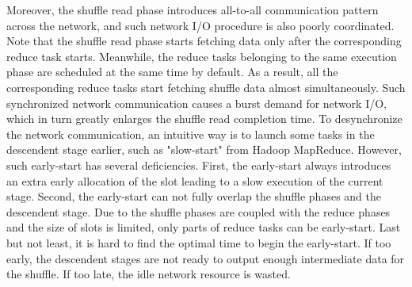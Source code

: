 Moreover, the shuffle read phase introduces all-to-all communication pattern across the network, and such network I/O procedure is also poorly coordinated.
Note that the shuffle read phase starts fetching data only after the corresponding reduce task starts.
Meanwhile, the reduce tasks belonging to the same execution phase are scheduled at the same time by default. 
As a result, all the corresponding reduce tasks start fetching shuffle data almost simultaneously.
Such synchronized network communication causes a burst demand for network I/O, which in turn greatly enlarges the shuffle read completion time. 
To desynchronize the network communication, an intuitive way is to launch some tasks in the descendent stage earlier, such as "slow-start" from Hadoop MapReduce.
{\color{black}
However, such early-start has several deficiencies.
First, the early-start always introduces an extra early allocation of the slot leading to a slow execution of the current stage.
Second, the early-start can not fully overlap the shuffle phases and the descendent stage. Due to the shuffle phases are coupled with the reduce phases and the size of slots is limited, only parts of reduce tasks can be early-start. 
Last but not least, it is hard to find the optimal time to begin the early-start. If too early, the descendent stages are not ready to output enough intermediate data for the shuffle. If too late, the idle network resource is wasted.
}



